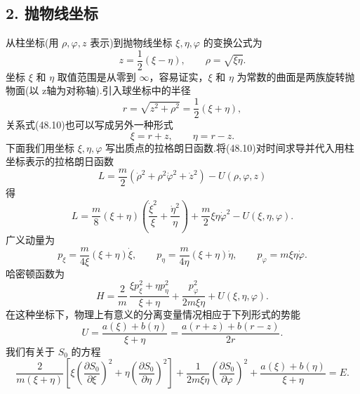 \subsection*{2. 抛物线坐标}

从柱坐标(用 $\rho,\varphi,z$
表示)到抛物线坐标 $\xi,\eta,\varphi$ 的变换公式为
\begin{equation}
  z=\frac{1}{2}(\xi-\eta),\qquad \rho=\sqrt{\xi\eta}.
\end{equation}
坐标 $\xi$ 和 $\eta$ 取值范围是从零到 $\infty$，容易证实，$\xi$
和 $\eta$
为常数的曲面是两族旋转抛物面(以 z轴为对称轴).引入球坐标中的半径
\begin{equation}
  r=\sqrt{z^2+\rho^2}=\frac{1}{2}(\xi+\eta),
\end{equation}
关系式(48.10)也可以写成另外一种形式
\begin{equation}
  \xi=r+z,\qquad \eta=r-z.
\end{equation}
下面我们用坐标 $\xi,\eta,\varphi$
写出质点的拉格朗日函数.将(48.10)对时间求导并代入用柱坐标表示的拉格朗日函数
\begin{equation*}
  L=\frac{m}{2}\left(\dot{\rho}^2+\rho^2\dot{\varphi}^2+\dot{z}^2\right)
  -U(\rho,\varphi,z)
\end{equation*}
得
\begin{equation}
  L=\frac{m}{8}(\xi+\eta)\left(\frac{\dot{\xi}^2}{\xi}
  +\frac{\dot{\eta}^2}{\eta}\right)
  +\frac{m}{2}\xi\eta\dot{\varphi}^2-U(\xi,\eta,\varphi).
\end{equation}
广义动量为
\begin{equation*}
  p_\xi=\frac{m}{4\xi}(\xi+\eta)\dot{\xi},\qquad
  p_\eta=\frac{m}{4\eta}(\xi+\eta)\dot{\eta},\qquad
  p_\varphi=m\xi\eta\dot{\varphi}.
\end{equation*}
哈密顿函数为
\begin{equation}
  H=\frac{2}{m}\,\frac{\xi p_\xi^2+\eta p_\eta^2}{\xi+\eta}
  +\frac{p_\varphi^2}{2m\xi\eta}+U(\xi,\eta,\varphi).
\end{equation}
在这种坐标下，物理上有意义的分离变量情况相应于下列形式的势能
\begin{equation}
  U=\frac{a(\xi)+b(\eta)}{\xi+\eta}
  =\frac{a(r+z)+b(r-z)}{2r}.
\end{equation}
我们有关于 $S_0$ 的方程
\begin{equation*}
  \frac{2}{m(\xi+\eta)}\left[\xi\left(\frac{\partial S_0}{\partial\xi}\right)^2
  +\eta\left(\frac{\partial S_0}{\partial\eta}\right)^2\right]
  +\frac{1}{2m\xi\eta}\left(\frac{\partial S_0}{\partial\varphi}\right)^2
  +\frac{a(\xi)+b(\eta)}{\xi+\eta}=E.
\end{equation*}

